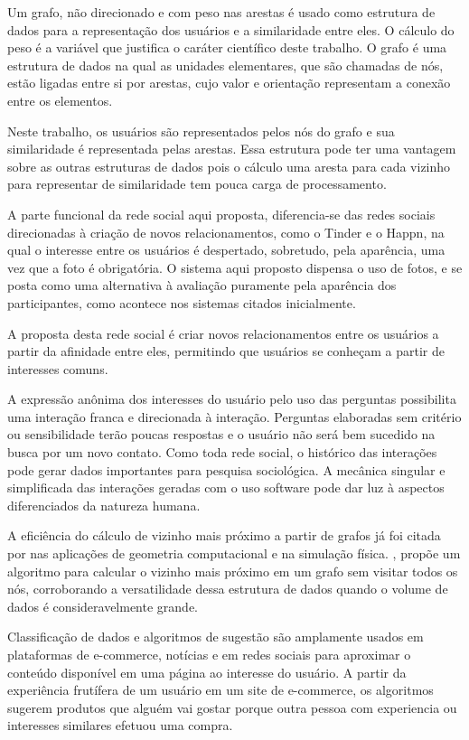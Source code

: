 Um grafo, não direcionado e com peso nas arestas é usado como estrutura de dados para a representação dos usuários e a similaridade entre eles. O cálculo do peso é a variável que justifica o caráter científico deste trabalho. O grafo é uma estrutura de dados na qual as unidades elementares, que são chamadas de nós,  estão ligadas entre si por arestas, cujo valor e orientação representam a conexão entre os elementos.

Neste trabalho, os usuários são representados pelos nós do grafo e sua similaridade é representada pelas arestas. Essa estrutura pode ter uma vantagem sobre as outras estruturas de dados pois o cálculo uma aresta para cada vizinho para representar de similaridade tem pouca carga de processamento.

A parte funcional da rede social aqui proposta, diferencia-se das redes sociais direcionadas à criação de novos relacionamentos, como o Tinder e o Happn, na qual o interesse entre os usuários é despertado, sobretudo, pela aparência, uma vez que a foto é obrigatória. O sistema aqui proposto dispensa o uso de fotos, e se posta como uma alternativa à avaliação puramente pela aparência dos participantes, como acontece nos sistemas citados inicialmente.

A proposta desta rede social é criar novos relacionamentos entre os usuários a partir da afinidade entre eles, permitindo que usuários se conheçam a partir de interesses comuns.

A expressão anônima dos interesses do usuário pelo uso das perguntas possibilita uma interação franca e direcionada à interação. Perguntas elaboradas sem critério ou sensibilidade terão poucas respostas e o usuário não será bem sucedido na busca por um novo contato. Como toda rede social, o histórico das interações pode gerar dados importantes para pesquisa sociológica. A mecânica singular e simplificada das interações geradas com o uso software pode dar luz à aspectos diferenciados da natureza humana.

A eficiência do cálculo de vizinho mais próximo a partir de grafos já foi citada por \cite{Paterson1992} nas aplicações de geometria computacional e na simulação física. \cite{Mishra2019}, propõe um algoritmo para calcular o vizinho mais próximo em um grafo sem visitar todos os nós, corroborando a versatilidade dessa estrutura de dados quando o volume de dados é consideravelmente grande.

Classificação de dados e algoritmos de sugestão são amplamente usados em plataformas de e-commerce, notícias e em redes sociais para aproximar o conteúdo disponível em uma página ao interesse do usuário. A partir da experiência frutífera de um usuário em um site de e-commerce, os algoritmos sugerem produtos que alguém vai gostar porque outra pessoa com experiencia ou interesses similares efetuou uma compra.

